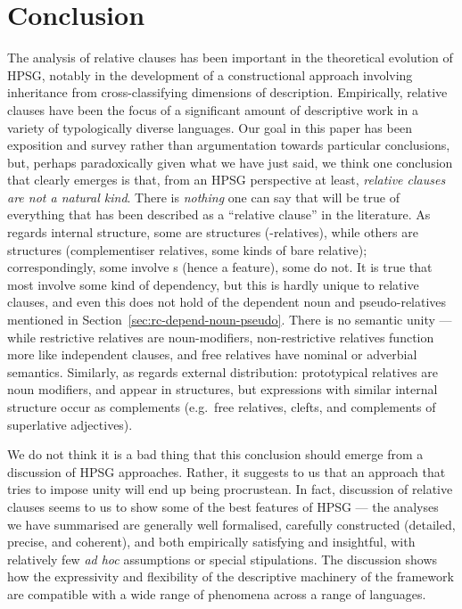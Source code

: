 \documentclass[output=paper
 	        ,biblatex
                ,babelshorthands
                ,newtxmath
                ,draftmode
                ,colorlinks, citecolor=brown
]{langscibook}
\begin{document}
\section{Conclusion}
\label{sec:rc-conclusion}

The analysis of relative clauses has been important in the theoretical evolution of HPSG,
notably in the development of a constructional approach involving inheritance from cross-classifying
dimensions of description. Empirically, relative clauses have been the focus
of a significant amount of descriptive work in a variety of typologically diverse
languages. Our goal in this paper has been exposition and survey rather than argumentation
towards particular conclusions, but, perhaps paradoxically given what we have just said, we
think one conclusion that clearly emerges is that, from an HPSG perspective at least,
\emph{relative clauses are not a natural kind}.
There is \emph{nothing} one can
say that will be true of everything that has been  described as a ``relative clause'' in
the literature. As
regards internal structure, some are  structures (-relatives),
while others are  structures (complementiser relatives, some kinds of
bare relative); correspondingly, some involve s (hence a 
feature), some do not. It is true that most involve some kind of 
dependency, but this is hardly unique to relative clauses, and even this does not hold of
the dependent noun and pseudo-relatives mentioned in
Section~\ref{sec:rc-depend-noun-pseudo}. There is no semantic unity --- while restrictive
relatives are noun-modifiers, non-restrictive relatives function more like independent clauses, and
free relatives have nominal or adverbial semantics. Similarly, as regards external distribution: prototypical
relatives are noun modifiers, and appear in
 structures, but
expressions with similar internal structure occur as complements (e.g.\ free
relatives, clefts, and complements of superlative adjectives).

We do not think it is a bad thing that this conclusion should emerge from a discussion of HPSG
approaches. Rather, it suggests to us that an approach that tries to impose unity will end
up being procrustean. In fact, discussion of relative clauses seems to us to show some of
the best features of HPSG --- the analyses we have summarised are generally well
formalised, carefully constructed (detailed, precise, and coherent), and both empirically
satisfying and insightful, with relatively few \emph{ad hoc} assumptions or special
stipulations. The discussion shows how the expressivity and flexibility of the descriptive
machinery of the framework are compatible with a wide range of phenomena across a range of
languages.
\end{document}
